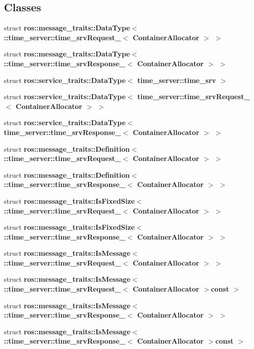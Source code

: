\subsection*{\-Classes}
\begin{DoxyCompactItemize}
\item 
struct {\bf ros\-::message\-\_\-traits\-::\-Data\-Type$<$ \-::time\-\_\-server\-::time\-\_\-srv\-Request\-\_\-$<$ Container\-Allocator $>$ $>$}
\item 
struct {\bf ros\-::message\-\_\-traits\-::\-Data\-Type$<$ \-::time\-\_\-server\-::time\-\_\-srv\-Response\-\_\-$<$ Container\-Allocator $>$ $>$}
\item 
struct {\bf ros\-::service\-\_\-traits\-::\-Data\-Type$<$ time\-\_\-server\-::time\-\_\-srv $>$}
\item 
struct {\bf ros\-::service\-\_\-traits\-::\-Data\-Type$<$ time\-\_\-server\-::time\-\_\-srv\-Request\-\_\-$<$ Container\-Allocator $>$ $>$}
\item 
struct {\bf ros\-::service\-\_\-traits\-::\-Data\-Type$<$ time\-\_\-server\-::time\-\_\-srv\-Response\-\_\-$<$ Container\-Allocator $>$ $>$}
\item 
struct {\bf ros\-::message\-\_\-traits\-::\-Definition$<$ \-::time\-\_\-server\-::time\-\_\-srv\-Request\-\_\-$<$ Container\-Allocator $>$ $>$}
\item 
struct {\bf ros\-::message\-\_\-traits\-::\-Definition$<$ \-::time\-\_\-server\-::time\-\_\-srv\-Response\-\_\-$<$ Container\-Allocator $>$ $>$}
\item 
struct {\bf ros\-::message\-\_\-traits\-::\-Is\-Fixed\-Size$<$ \-::time\-\_\-server\-::time\-\_\-srv\-Request\-\_\-$<$ Container\-Allocator $>$ $>$}
\item 
struct {\bf ros\-::message\-\_\-traits\-::\-Is\-Fixed\-Size$<$ \-::time\-\_\-server\-::time\-\_\-srv\-Response\-\_\-$<$ Container\-Allocator $>$ $>$}
\item 
struct {\bf ros\-::message\-\_\-traits\-::\-Is\-Message$<$ \-::time\-\_\-server\-::time\-\_\-srv\-Request\-\_\-$<$ Container\-Allocator $>$ $>$}
\item 
struct {\bf ros\-::message\-\_\-traits\-::\-Is\-Message$<$ \-::time\-\_\-server\-::time\-\_\-srv\-Request\-\_\-$<$ Container\-Allocator $>$const  $>$}
\item 
struct {\bf ros\-::message\-\_\-traits\-::\-Is\-Message$<$ \-::time\-\_\-server\-::time\-\_\-srv\-Response\-\_\-$<$ Container\-Allocator $>$ $>$}
\item 
struct {\bf ros\-::message\-\_\-traits\-::\-Is\-Message$<$ \-::time\-\_\-server\-::time\-\_\-srv\-Response\-\_\-$<$ Container\-Allocator $>$const  $>$}

\end{DoxyCompactItemize}
